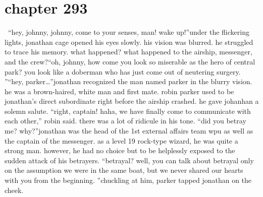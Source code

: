 \section{chapter 293}






 “hey, johnny, johnny, come to your senses, man! wake up!”under the flickering lights, jonathan cage opened his eyes slowly.
 his vision was blurred.
he struggled to trace his memory.
 what happened? what happened to the airship, messenger, and the crew?“oh, johnny, how come you look so miserable as the hero of central park? you look like a doberman who has just come out of neutering surgery.
”“hey, parker…”jonathan recognized the man named parker in the blurry vision.
 he was a brown-haired, white man and first mate.
 robin parker used to be jonathan’s direct subordinate right before the airship crashed.
he gave johanhan a solemn salute.
“right, captain! haha, we have finally come to communicate with each other,” robin said.
there was a lot of ridicule in his tone.
“did you betray me? why?”jonathan was the head of the 1st external affairs team wpu as well as the captain of the messenger.
 as a level 19 rock-type wizard, he was quite a strong man.
however, he had no choice but to be helplessly exposed to the sudden attack of his betrayers.
“betrayal? well, you can talk about betrayal only on the assumption we were in the same boat, but we never shared our hearts with you from the beginning.
”chuckling at him, parker tapped jonathan on the cheek.

